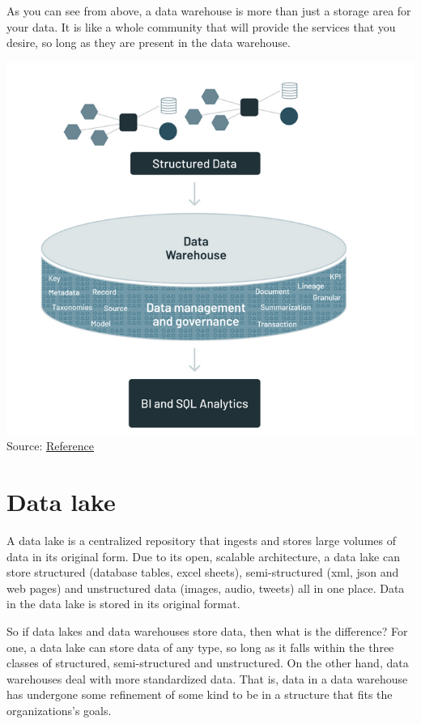 \documentclass[
]{book}
\begin{document}
As you can see from above, a data warehouse is more than just a storage area for your data. It is like a whole community that will provide the services that you desire, so long as they are present in the data warehouse.

\includegraphics{./images/data_warehouse.png}
Source: \href{https://www.databricks.com/blog/2021/05/19/evolution-to-the-data-lakehouse.html}{Reference}

\hypertarget{data-lake}{%
\section{Data lake}\label{data-lake}}

A data lake is a centralized repository that ingests and stores large volumes of data in its original form. Due to its open, scalable architecture, a data lake can store structured (database tables, excel sheets), semi-structured (xml, json and web pages) and unstructured data (images, audio, tweets) all in one place. Data in the data lake is stored in its original format.

So if data lakes and data warehouses store data, then what is the difference? For one, a data lake can store data of any type, so long as it falls within the three classes of structured, semi-structured and unstructured. On the other hand, data warehouses deal with more standardized data. That is, data in a data warehouse has undergone some refinement of some kind to be in a structure that fits the organizations's goals.
\end{document}
